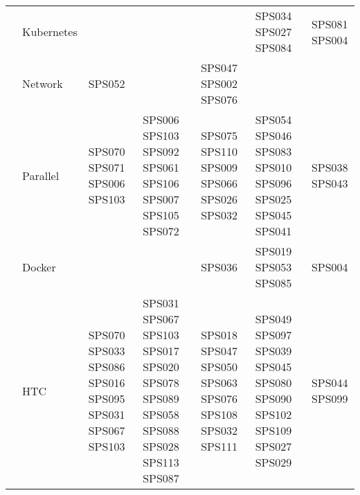 \begin{table}[htbp]
\begin{tabularx}{\textwidth}{p{0.8cm}p{2.5cm}>{\raggedright\arraybackslash}X>{\raggedright\arraybackslash}X>{\raggedright\arraybackslash}X>{\raggedright\arraybackslash}X>{\raggedright\arraybackslash}X}
		\addlinespace[0.3em]
		                                      & Kubernetes              &                                                         &                                                                                                                               &                                                                                            & SPS034 SPS027 SPS084                                                                & SPS081 SPS004                      \\
		\addlinespace[0.3em]
		                                      & Network                 & SPS052                                                  &                                                                                                                               & SPS047 SPS002 SPS076                                                                       &                                                                                     &                                    \\
		\addlinespace[0.3em]
		                                      & Parallel                & SPS070 SPS071 SPS006 SPS103                             & SPS006 SPS103 SPS092 SPS061 SPS106 SPS007 SPS105 SPS072                                                                       & SPS075 SPS110 SPS009 SPS066 SPS026 SPS032                                                  & SPS054 SPS046 SPS083 SPS010 SPS096 SPS025 SPS045 SPS041                             & SPS038 SPS043                      \\
		\addlinespace[0.3em]
		                                      & Docker                  &                                                         &                                                                                                                               & SPS036                                                                                     & SPS019 SPS053 SPS085                                                                & SPS004                             \\
		\addlinespace[0.3em]
		                                      & HTC                     & SPS070 SPS033 SPS086 SPS016 SPS095 SPS031 SPS067 SPS103 & SPS031 SPS067 SPS103 SPS017 SPS020 SPS078 SPS089 SPS058 SPS088 SPS028 SPS113 SPS087                                           & SPS018 SPS047 SPS050 SPS063 SPS076 SPS108 SPS032 SPS111                                    & SPS049 SPS097 SPS039 SPS045 SPS080 SPS090 SPS102 SPS109 SPS027 SPS029               & SPS044 SPS099                      \\

\end{tabularx}
\end{table}
